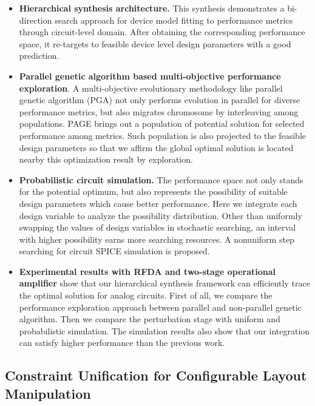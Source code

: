       \begin{itemize}
      \item {\bf Hierarchical synthesis architecture.} This synthesis demonstrates a bi-direction search approach for device model fitting to performance metrics through circuit-level domain. After obtaining the corresponding performance space, it re-targets to feasible device level design parameters with a good prediction.
      \item {\bf Parallel genetic algorithm based multi-objective performance exploration}. A multi-objective evolutionary methodology like parallel genetic algorithm (PGA) not only performs evolution in parallel for diverse performance metrics, but also migrates chromosome by interleaving among populations. PAGE brings out a population of potential solution for selected performance among metrics. Such population is also projected to the feasible design parameters so that we affirm the global optimal solution is located nearby this optimization result by exploration.
      \item {\bf Probabilistic circuit simulation.} The performance space not only stands for the potential optimum, but also represents the possibility of suitable design parameters which cause better performance. Here we integrate each design variable to analyze the possibility distribution. Other than uniformly swapping the values of design variables in stochastic searching, an interval with higher possibility earns more searching resources. A nonuniform step searching for circuit SPICE simulation is proposed.
      \item {\bf Experimental results with RFDA and two-stage operational amplifier} show that our hierarchical synthesis framework can efficiently trace the optimal solution for analog circuits. First of all, we compare the performance exploration approach between parallel and non-parallel genetic algorithm. Then we compare the perturbation stage with uniform and probabilistic simulation. The simulation results also show that our integration can satisfy higher performance than the previous work.
      \end{itemize}

    \subsection{Constraint Unification for Configurable Layout Manipulation}
    \label{subsec:CCDARContribute}

